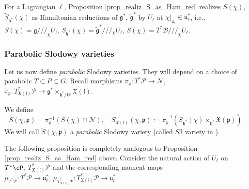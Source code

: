\documentclass[12pt]{amsart}
\begin{document}
\begin{rmk}\label{rem_ham_real_of_parab_S}
   For a Lagrangian $\ell$, Proposition \ref{prop_realiz_S_as_Ham_red} realizes $S(\chi)$, $\widetilde{S}_{\mathfrak{h}^*}(\chi)$ as Hamiltonian reductions of $\mathfrak{g}^*$, $\widetilde{\mathfrak{g}}^*$ by $U_\ell$ at $\chi|_{\mathfrak{u}_\ell} \in \mathfrak{u}_\ell^*$, i.e., $S(\chi)=\mathfrak{g}/\!/\!/_{\chi}U_{\ell}$, $\widetilde{S}_{\mathfrak{h}^*}(\chi)=\widetilde{\mathfrak{g}}^*/\!/\!/\!_{\chi} U_{\ell}$, $\widetilde{S}(\chi)=T^*\mathcal{B}/\!/\!/_\chi U_{\ell}$. 
\end{rmk}    



    \subsubsection{Parabolic Slodowy varieties}\label{parabolic Slodowy subsection}
    Let us now define {\emph{parabolic}} Slodowy varieties. They will depend on a choice of parabolic $T \subset P \subset G$. Recall  morphisms 
    $\pi_{\mathfrak{p}} \colon T^*\mathcal{P} \rightarrow \mathcal{N}$, $\widetilde{\pi}_{\mathfrak{p}}\colon T^*_{\mathfrak{X}(\mathfrak{l})}\mathcal{P} \rightarrow \mathfrak{g}^* \times_{\mathfrak{h}^*/W} \mathfrak{X}(\mathfrak{l})$.

    We define 
    \begin{equation*}
    \widetilde{S}(\chi,\mathfrak{p})=\pi_{\mathfrak{p}}^{-1}(S(\chi) \cap \mathcal{N}), \quad \widetilde{S}_{\mathfrak{X}(\mathfrak{l})}(\chi,\mathfrak{p}):=\widetilde{\pi}_{\mathfrak{p}}^{-1}(S_{\mathfrak{h}^*}(\chi) \times_{\mathfrak{h}^*} \mathfrak{X}(\mathfrak{p})).
    \end{equation*}
    We will call $\widetilde{S}(\chi,\mathfrak{p})$ a {\em{parabolic}} Slodowy variety (called $S3$ variety in \cite{w}).

    The following proposition is completely analogous to Proposition \ref{prop_realiz_S_as_Ham_red} above.
    Consider the natural action of $U_{\ell}$ on $T^*\cP$, $T^*_{\mathfrak{X}(\mathfrak{l})}\mathcal{P}$ and the corresponding moment maps $\mu_{T^*\mathcal{P}}\colon T^*\mathcal{P} \rightarrow \mathfrak{u}_{\ell}^*,\, \mu_{T^*_{\mathfrak{X}(\mathfrak{l})}\mathcal{P}}\colon T^*_{\mathfrak{X}(\mathfrak{l})}\mathcal{P} \rightarrow \mathfrak{u}_{\ell}^*$.
\end{document}
